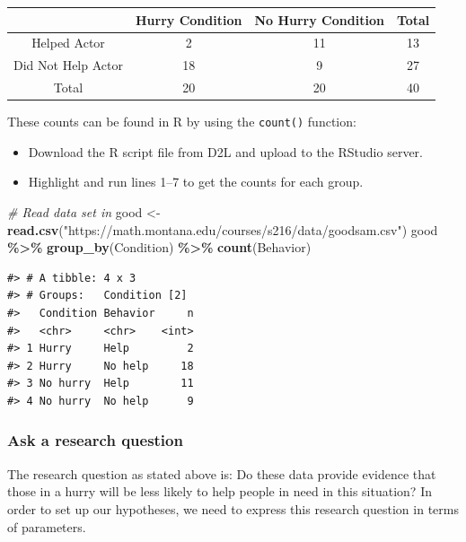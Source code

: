 \documentclass[
]{report}
\newenvironment{Shaded}{\begin{snugshade}}{\end{snugshade}}
\newcommand{\CommentTok}[1]{\textcolor[rgb]{0.56,0.35,0.01}{\textit{#1}}}
\newcommand{\FunctionTok}[1]{\textcolor[rgb]{0.13,0.29,0.53}{\textbf{#1}}}
\newcommand{\NormalTok}[1]{#1}
\newcommand{\OtherTok}[1]{\textcolor[rgb]{0.56,0.35,0.01}{#1}}
\newcommand{\SpecialCharTok}[1]{\textcolor[rgb]{0.81,0.36,0.00}{\textbf{#1}}}
\newcommand{\StringTok}[1]{\textcolor[rgb]{0.31,0.60,0.02}{#1}}
\begin{document}
\begin{center}
\begin{tabular}{|c|c|c|c|}\hline
& Hurry Condition & No Hurry Condition & Total \\ \hline
Helped Actor & 2 & 11 & 13 \\ \hline
Did Not Help Actor & 18 & 9 & 27 \\ \hline
Total & 20 & 20 & 40 \\ \hline
\end{tabular}
\end{center}

These counts can be found in R by using the \texttt{count()} function:

\begin{itemize}
\item
  Download the R script file from D2L and upload to the RStudio server.
\item
  Highlight and run lines 1--7 to get the counts for each group.
\end{itemize}

\begin{Shaded}
\begin{Highlighting}[]
\CommentTok{\# Read data set in}
\NormalTok{good }\OtherTok{\textless{}{-}} \FunctionTok{read.csv}\NormalTok{(}\StringTok{"https://math.montana.edu/courses/s216/data/goodsam.csv"}\NormalTok{) }
\NormalTok{good }\SpecialCharTok{\%\textgreater{}\%} \FunctionTok{group\_by}\NormalTok{(Condition) }\SpecialCharTok{\%\textgreater{}\%} \FunctionTok{count}\NormalTok{(Behavior)}
\end{Highlighting}
\end{Shaded}

\begin{verbatim}
#> # A tibble: 4 x 3
#> # Groups:   Condition [2]
#>   Condition Behavior     n
#>   <chr>     <chr>    <int>
#> 1 Hurry     Help         2
#> 2 Hurry     No help     18
#> 3 No hurry  Help        11
#> 4 No hurry  No help      9
\end{verbatim}

\subsubsection*{Ask a research question}\label{ask-a-research-question-3}

The research question as stated above is: Do these data provide evidence that those in a hurry will be less likely to help people in need in this situation? In order to set up our hypotheses, we need to express this research question in terms of parameters.
\end{document}
